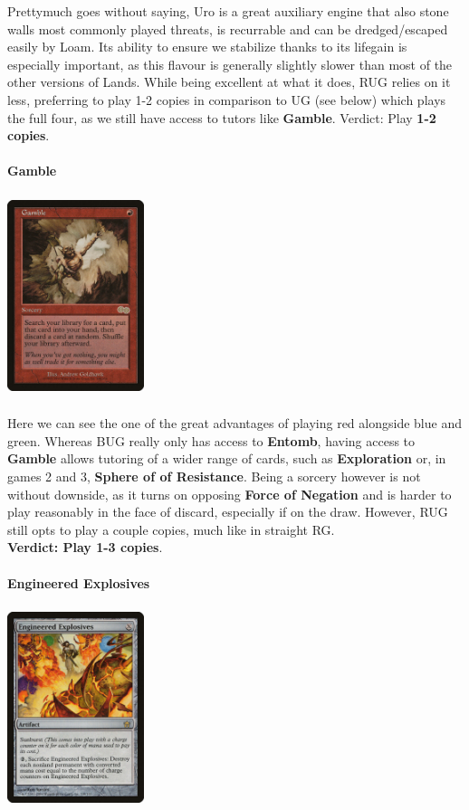 \documentclass{report}
\begin{document}
Prettymuch goes without saying, Uro is a great auxiliary engine that also stone walls most commonly played threats, is recurrable and can be dredged/escaped easily by Loam. Its ability to ensure we stabilize thanks to its lifegain is especially important, as this flavour is generally slightly slower than most of the other versions of Lands. While being excellent at what it does, RUG relies on it less, preferring to play 1-2 copies in comparison to UG (see below) which plays the full four, as we still have access to tutors like \textbf{Gamble}.
Verdict: Play \textbf{1-2 copies}.\\\\
\textbf{Gamble\\}
\begin{center}
\includegraphics [width = 4cm, height = 6cm] {gamble}
\end{center}
Here we can see the one of the great advantages of playing red alongside blue and green. Whereas BUG really only has access to \textbf{Entomb}, having access to \textbf{Gamble} allows tutoring of a wider range of cards, such as \textbf{Exploration} or, in games 2 and 3, \textbf{Sphere of of Resistance}.
Being a sorcery however is not without downside, as it turns on opposing \textbf{Force of Negation} and is harder to play reasonably in the face of discard, especially if on the draw. However, RUG still opts to play a couple copies, much like in straight RG.\\
\textbf{Verdict: Play 1-3 copies}.\\\\
\textbf{Engineered Explosives}
\begin{center}
\includegraphics [width = 4cm, height = 6cm] {engineered-explosives}
\end{center}
\end{document}
